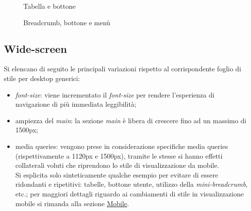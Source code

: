 \documentclass[]{article}
\begin{document}
\begin{figure}[H]
	\centering
	\caption{Tabella e bottone}
\end{figure}

\begin{figure}[H]
	\centering
	\caption{Breadcrumb, bottone e menù}
\end{figure}

\newpage
\subsection{Wide-screen}
Si elencano di seguito le principali variazioni rispetto al corrispondente foglio di stile per desktop generici:
\begin{itemize}
	\item\textit{font-size}: viene incrementato il \textit{font-size} per rendere l'esperienza di navigazione di più immediata leggibilità;
	\item ampiezza del \textit{main}: la sezione \textit{main} è libera di crescere fino ad un massimo di 1500px;
	\item media queries: vengono prese in considerazione specifiche media queries (rispettivamente a 1120px e 1500px), tramite le stesse si hanno effetti collaterali voluti che riprendono lo stile di visualizzazione da mobile.\\
	Si esplicita solo sinteticamente qualche esempio per evitare di essere ridondanti e ripetitivi:  tabelle, bottone utente, utilizzo della \textit{mini-breadcrumb}, etc.; per maggiori dettagli riguardo ai cambiamenti di stile in visualizzazione mobile si rimanda alla sezione \hyperref[presentazione:mobile]{\underline{Mobile}}.
\end{itemize}
\end{document}
